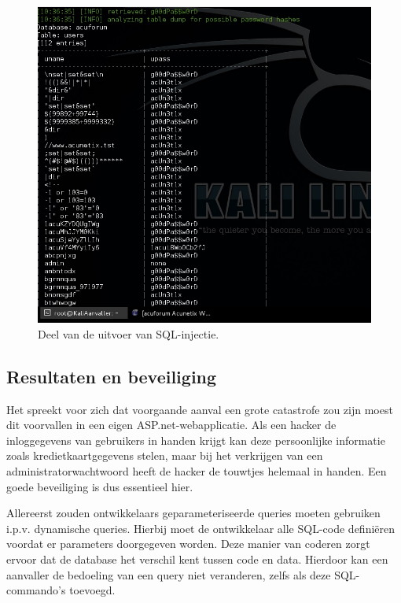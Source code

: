 \documentclass[pdftex,a4paper,12pt]{report}
\begin{document}
\begin{figure}[H]
\begin{center}
\includegraphics[scale=0.60]{img/SQLData}
\end{center}
\caption{Deel van de uitvoer van SQL-injectie.}
\label{img:SQLData}
\end{figure}

\subsection{Resultaten en beveiliging}
Het spreekt voor zich dat voorgaande aanval een grote catastrofe zou zijn moest dit voorvallen in een eigen ASP.net-webapplicatie. Als een hacker de inloggegevens van gebruikers in handen krijgt kan deze persoonlijke informatie zoals kredietkaartgegevens stelen, maar bij het verkrijgen van een administratorwachtwoord heeft de hacker de touwtjes helemaal in handen. Een goede beveiliging is dus essentieel hier. \newline

Allereerst zouden ontwikkelaars geparameteriseerde queries moeten gebruiken i.p.v. dynamische queries. Hierbij moet de ontwikkelaar alle SQL-code definiëren voordat er parameters doorgegeven worden. Deze manier van coderen zorgt ervoor dat de database het verschil kent tussen code en data. Hierdoor kan een aanvaller de bedoeling van een query niet veranderen, zelfs als deze SQL-commando's toevoegd. \citep{Wichers2013}
\end{document}
